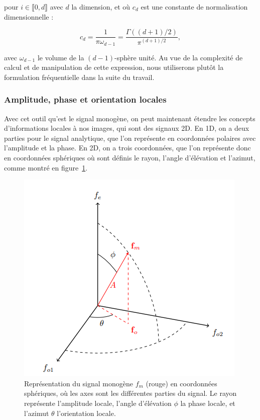 pour $i\in\llbracket 0, d\rrbracket$ avec $d$ la dimension, et où $c_d$ est une constante de normalisation dimensionnelle :

\begin{equation}
    c_d = \frac1{\pi\omega_{d-1}} = \frac{\Gamma((d+1)/2)}{\pi^{(d+1)/2}},
\end{equation}

avec $\omega_{d-1}$ le volume de la $(d-1)$-sphère unité. Au vue de la complexité de calcul et de manipulation de cette expression, nous utiliserons plutôt la formulation fréquentielle dans la suite du travail.

\subsubsection{Amplitude, phase et orientation locales}

Avec cet outil qu'est le signal monogène, on peut maintenant étendre les concepts d'informations locales à nos images, qui sont des signaux 2D. En 1D, on a deux parties pour le signal analytique, que l'on représente en coordonnées polaires avec l'amplitude et la phase. En 2D, on a trois coordonnées, que l'on représente donc en coordonnées sphériques où sont définis le rayon, l'angle d'élévation et l'azimut, comme montré en figure~\ref{fig:spherical-representation}.

\bigskip

\begin{figure}
    \centering
    \includegraphics[width=.45\textwidth]{contenu/resources/images/spherical_representation}
    \caption[Représentation du signal monogène en coordonnées sphériques]{Représentation du signal monogène $f_m$ (rouge) en coordonnées sphériques, où les axes sont les différentes parties du signal. Le rayon représente l'amplitude locale, l'angle d'élévation $\phi$ la phase locale, et l'azimut $\theta$ l'orientation locale.}
    \label{fig:spherical-representation}
\end{figure}

